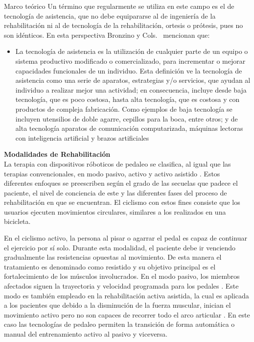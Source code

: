 \begin{thesischapter}{1} {Marco teórico}
    \vspace{10pt}
    Un término que regularmente se utiliza en este campo es el de tecnología de asistencia, que
    no debe equipararse al de ingeniería de la rehabilitación ni al de tecnología de la rehabilitación, ortesis o 
    prótesis, pues no son idénticos. En esta perspectiva Bronzino y Cols.~\cite{enderle2012introduction}  mencionan que:

    \begin{itemize}
        \item  La tecnología de asistencia es la utilización de cualquier parte de un equipo o sistema productivo modificado o comercializado, para incrementar o mejorar capacidades funcionales de un individuo. Esta definición ve
        la tecnología de asistencia como una serie de aparatos, estrategias y/o servicios, que ayudan al individuo a realizar mejor una actividad; en consecuencia, incluye desde baja
        tecnología, que es poco costosa, hasta alta tecnología, que es costosa y con productos de compleja fabricación. Como ejemplos de baja
        tecnología se incluyen utensilios de doble agarre, cepillos para la boca, entre otros; y de
        alta tecnología aparatos de comunicación computarizada, máquinas lectoras con inteligencia artificial y brazos artificiales
    \end{itemize}
    
    \vspace{10pt}
    \textbf{Modalidades de Rehabilitación} \\ 
    La terapia con dispositivos róboticos de pedaleo se clasifica, al igual que las terapias
    convencionales, en modo pasivo, activo y activo asistido \cite{barclay2019effect}. Estos diferentes enfoques
    se preescriben según el grado de las secuelas que padece el paciente, el nivel de
    conciencia de este y las diferentes fases del proceso de rehabilitación en que se
    encuentran. El ciclismo con estos fines consiste que los usuarios ejecuten movimientos
    circulares, similares a los realizados en una bicicleta.

    \vspace{5pt}
    En el ciclismo activo, la persona al pisar o agarrar el pedal es capaz de continuar el
    ejercicio por sí solo. Durante esta modalidad, el paciente debe ir venciendo gradualmente
    las resistencias opuestas al movimiento. De esta manera el tratamiento es denominado
    como resistido y su objetivo principal es el fortalecimiento de los músculos involucrados.
    En el modo pasivo, los miembros afectados siguen la trayectoria y velocidad programada
    para los pedales \cite{ferreira2020virtual}. Este modo es también empleado en la rehabilitación activa asistida,
    la cual es aplicada a los pacientes que debido a la disminución de la fuerza muscular,
    inician el movimiento activo pero no son capaces de recorrer todo el arco articular \cite{cruz2009guia}.
    En este caso las tecnologías de pedaleo permiten la transición de forma automática o
    manual del entrenamiento activo al pasivo y viceversa.


\end{thesischapter}
